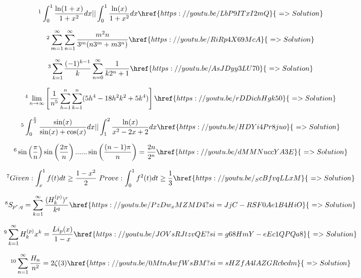 \documentclass[12pt]{article}
\begin{document}
\[ \footnote{ An easy modification of famous PUTNAM problem} \int_0^1 \frac{\ln(1+x)}{1+x^2} dx ||  \int_0^{1} \frac{\ln(x)}{1+x^2} dx      \href{https://youtu.be/LbP9ITxI2mQ}{\,\, => Solution}    \]


\[ \footnote{ PUTNAM 1999 A4 series problem} \sum_{m=1}^{\infty} \sum_{n=1}^{\infty} \frac{m^2n}{3^m (n3^m+m3^n)}    \href{https://youtu.be/RiRp4X69McA}{\,\, => Solution}     \]

 
\[ \footnote{ PUTNAM 2016 B6 Double Summation Problem} \sum_{k=1}^{\infty} \frac{(-1)^{k-1}}{k} \sum_{n=0}^{\infty} \frac{1}{k2^n+1}     \href{https://youtu.be/AsJDyy3LU70}{\,\, => Solution}     \]


\[ \footnote{ PUTNAM 1981 B1 A Simple Sum limit } \lim_{n \to \infty} \left[ \frac{1}{n^5} \sum_{h=1}^n \sum_{k=1}^n (5h^4-18h^2k^2+5k^4) \right]    \href{https://youtu.be/rDDichHgk50}{\,\, => Solution}    \]

\[ \footnote{ Use King's Rule and extended King's Rule} \int_0^{\frac{\pi}{2}} \frac{\sin(x)}{\sin(x)+\cos(x)} dx || \int_1^2 \frac{\ln(x)}{x^2-2x+2} dx      \href{https://youtu.be/HDYi4Pr8juo}{\,\, => Solution}     \]

\[ \footnote{ Product of Sines is easily proved using Complex Number} \sin\left( \frac{\pi}{n} \right) \sin\left( \frac{2\pi}{n} \right)......\sin\left( \frac{(n-1)\pi}{n} \right) = \frac{2n}{2^n}      \href{https://youtu.be/dMMNuccYA3E}{\,\, => Solution}     \]

\[ \footnote{ Solving an average IMC inequality} Given:  \int_x^1 f(t) dt \ge \frac{1-x^2}{2} \,\,Prove:  \int_0^1 f^2(t) dt \ge \frac{1}{3}      \href{https://youtu.be/_ScBfvqLLxM}{\,\, => Solution}    \]



\[ \footnote{ A short introduction to Euler Sums Credit: Advanced Integration Techniques by Zaid Alyafeai} S_{p^r,q}= \sum_{k=1}^{\infty} \frac{(H_k^{(p)})^r}{k^q}      \href{https://youtu.be/PzDw_xMZMD4?si=JjC-RSF0Ae1B4HiO}{\,\, => Solution}  \]
 
\[ \footnote{ Generating function associated with the Harmonic number of order p  Credit: Advanced Integration Techniques by Zaid Alyafeai } \sum_{k=1}^{\infty} H_k^{(p)} x^k =  \frac{Li_p(x)}{1-x}   \href{https://youtu.be/JOVsRJtzvQE?si=g68HmY-eEc1QPQa8}{\,\, => Solution}  \]

\[ \footnote{ Using the integral representation of Harmonic number to solve this elegant sum  Credit: Advanced Integration Techniques by Zaid Alyafeai } \sum_{n=1}^{\infty} \frac{H_n}{n^2} = 2 \zeta(3)     \href{https://youtu.be/0MtnAwfWsBM?si=sHZfA4lAZGRcbcdm}{\,\, => Solution}   \]
\end{document}
